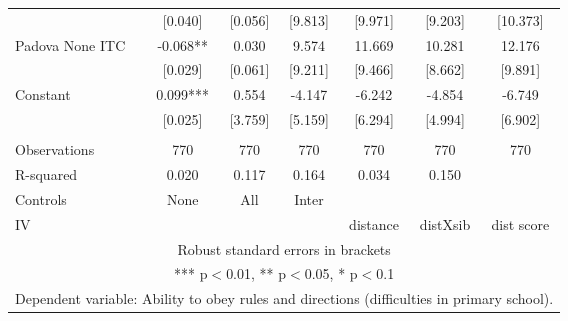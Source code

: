 \begin{tabular}{lcccccc}
 & [0.040] & [0.056] & [9.813] & [9.971] & [9.203] & [10.373] \\
Padova None ITC & -0.068** & 0.030 & 9.574 & 11.669 & 10.281 & 12.176 \\
 & [0.029] & [0.061] & [9.211] & [9.466] & [8.662] & [9.891] \\
Constant & 0.099*** & 0.554 & -4.147 & -6.242 & -4.854 & -6.749 \\
 & [0.025] & [3.759] & [5.159] & [6.294] & [4.994] & [6.902] \\
 &  &  &  &  &  &  \\
Observations & 770 & 770 & 770 & 770 & 770 & 770 \\
R-squared & 0.020 & 0.117 & 0.164 & 0.034 & 0.150 &  \\
Controls & None & All & Inter &  &  &  \\
 IV &  &  &  & distance & distXsib & dist score \\ \hline
\multicolumn{7}{c}{ Robust standard errors in brackets} \\
\multicolumn{7}{c}{ *** p$<$0.01, ** p$<$0.05, * p$<$0.1} \\
\multicolumn{7}{c}{ Dependent variable: Ability to obey rules and directions (difficulties in primary school).} \\
\end{tabular}
